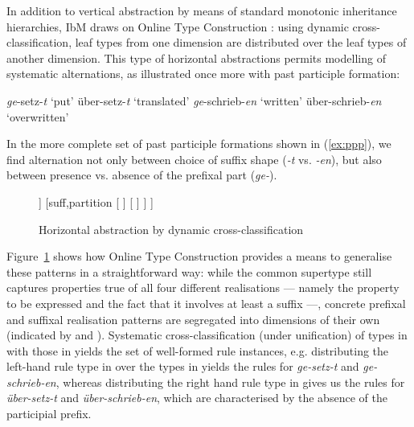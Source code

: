 \documentclass[output=paper
	        ,collection
	        ,collectionchapter
 	        ,biblatex
                ,babelshorthands
                ,newtxmath
                ,draftmode
                ,colorlinks, citecolor=brown
]{langscibook}
\begin{document}
\begin{exe}
\begin{xlist}
\begin{exe}
\begin{xlist}
In addition to vertical abstraction by means of standard monotonic
inheritance hierarchies, IbM draws on Online Type Construction
\citep{Koenig94}: using dynamic cross-classification, leaf types from
one dimension are distributed over the leaf types of another
dimension. This type of horizontal abstractions permits modelling of
systematic alternations, as illustrated once more with  past
participle formation:

\begin{exe}
  \ex \label{ex:ppp}
  \begin{xlist}

    \ex \textit{ge}-setz-\textit{t} `put'
    \ex über-setz-\textit{t} `translated'
    \ex \textit{ge}-schrieb-\textit{en} `written'
    \ex über-schrieb-\textit{en} `overwritten'
  \end{xlist}
\end{exe}

In the more complete set of past participle formations shown in
(\ref{ex:ppp}), we find alternation not only between choice of suffix
shape (\textit{-t} vs. \textit{-en}), but also between presence
vs. absence of the prefixal part (\textit{ge-}).

\begin{figure}
  \centering
  \footnotesize
\begin{forest}
[%
\avm{
	[mud &	\{[tam & ppp]\} \\
	mph & < \ldots\ , [pc & 1] > ]
}
	[pref,partition
		[%
		\avm{
			[mph & <[ph & ge \\
					pc & -1], ![ ]!> ]
		}
		]
		[%
		\avm{
			[mph & <![ ]!> ]
		}
		]
	]
	[suff,partition
		[%
		]
		[%
		]
	]
]
\end{forest}
  \caption{Horizontal abstraction by dynamic cross-classification}\label{fig:Horizontal}
\end{figure}

Figure~\ref{fig:Horizontal} shows how Online Type Construction provides
a means to generalise these patterns in a straightforward way: while the
common supertype still captures properties true of all four different
realisations --- namely the property to be expressed and the fact that it
involves at least a suffix ---, concrete prefixal and suffixal realisation
patterns are segregated into dimensions of their own (indicated by
 and ). Systematic cross-classification
(under unification) of types in  with those in
 yields the set of well-formed rule instances,
e.g. distributing the left-hand rule type in  over the
types in  yields the rules for \textit{ge-setz-t} and
\textit{ge-schrieb-en}, whereas distributing the right hand rule type
in  gives us the rules for \textit{über-setz-t} and
\textit{über-schrieb-en}, which are characterised by the absence of
the participial prefix.


\end{xlist}
\end{exe}
\end{xlist}
\end{exe}
\end{document}
